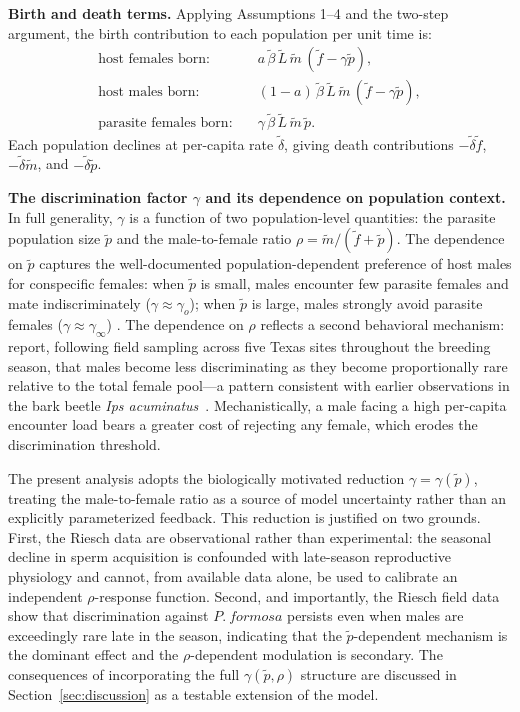 \documentclass[12pt]{article}
\begin{document}
\noindent\textbf{Birth and death terms.}
Applying Assumptions 1--4 and the two-step argument, the birth
contribution to each population per unit time is:
%
\begin{align}
  \text{host females born:}   &\quad
    a\,\tilde{\beta}\,\tilde{L}\,\tilde{m}\,(\tilde{f}-\gamma\tilde{p}),
    \label{eq:birth_f} \\[4pt]
  \text{host males born:}     &\quad
    (1-a)\,\tilde{\beta}\,\tilde{L}\,\tilde{m}\,(\tilde{f}-\gamma\tilde{p}),
    \label{eq:birth_m} \\[4pt]
  \text{parasite females born:}  &\quad
    \gamma\,\tilde{\beta}\,\tilde{L}\,\tilde{m}\,\tilde{p}.
    \label{eq:birth_p}
\end{align}
%
Each population declines at per-capita rate $\tilde{\delta}$, giving
death contributions $-\tilde{\delta}\tilde{f}$,
$-\tilde{\delta}\tilde{m}$, and $-\tilde{\delta}\tilde{p}$.

\noindent\textbf{The discrimination factor $\gamma$ and its dependence on
population context.}  In full generality, $\gamma$ is a function of two
population-level quantities: the parasite population size $\tilde{p}$ and
the male-to-female ratio $\rho = \tilde{m}/(\tilde{f}+\tilde{p})$.
The dependence on $\tilde{p}$ captures the well-documented
population-dependent preference of host males for conspecific females: when
$\tilde{p}$ is small, males encounter few parasite females and mate
indiscriminately ($\gamma \approx \gamma_o$); when $\tilde{p}$ is large,
males strongly avoid parasite females ($\gamma \approx \gamma_\infty$)
\citep{Balsano1989}.  The dependence on $\rho$ reflects a second
behavioral mechanism: \citet{Riesch2008} report, following field sampling
across five Texas sites throughout the breeding season, that males become
less discriminating as they become proportionally rare relative to the
total female pool---a pattern consistent with earlier observations in the
bark beetle \textit{Ips acuminatus}~\citep{Loyning1996}.  Mechanistically,
a male facing a high per-capita encounter load bears a greater cost of
rejecting any female, which erodes the discrimination threshold.

The present analysis adopts the biologically motivated reduction
$\gamma = \gamma(\tilde{p})$, treating the male-to-female ratio as a
source of model uncertainty rather than an explicitly parameterized
feedback.  This reduction is justified on two grounds.  First, the
Riesch data are observational rather than experimental: the seasonal
decline in sperm acquisition is confounded with late-season reproductive
physiology and cannot, from available data alone, be used to calibrate an
independent $\rho$-response function.  Second, and importantly, the
Riesch field data show that discrimination against $P.~formosa$ persists
even when males are exceedingly rare late in the season, indicating that
the $\tilde{p}$-dependent mechanism is the dominant effect and the
$\rho$-dependent modulation is secondary.  The consequences of
incorporating the full $\gamma(\tilde{p}, \rho)$ structure are discussed
in Section~\ref{sec:discussion} as a testable extension of the model.
\end{document}
